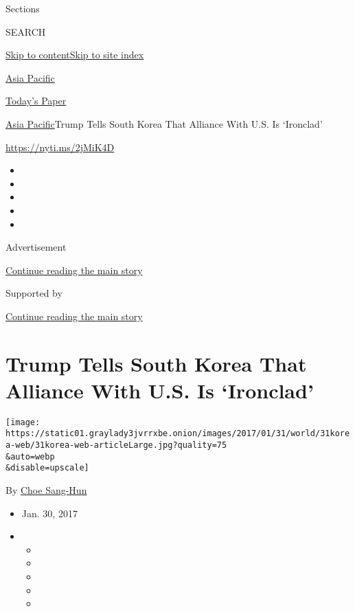 Sections

SEARCH

\protect\hyperlink{site-content}{Skip to
content}\protect\hyperlink{site-index}{Skip to site index}

\href{https://www.nytimes3xbfgragh.onion/section/world/asia}{Asia
Pacific}

\href{https://myaccount.nytimes3xbfgragh.onion/auth/login?response_type=cookie\&client_id=vi}{}

\href{https://www.nytimes3xbfgragh.onion/section/todayspaper}{Today's
Paper}

\href{/section/world/asia}{Asia Pacific}\textbar{}Trump Tells South
Korea That Alliance With U.S. Is `Ironclad'

\url{https://nyti.ms/2jMiK4D}

\begin{itemize}
\item
\item
\item
\item
\item
\end{itemize}

Advertisement

\protect\hyperlink{after-top}{Continue reading the main story}

Supported by

\protect\hyperlink{after-sponsor}{Continue reading the main story}

\hypertarget{trump-tells-south-korea-that-alliance-with-us-is-ironclad}{%
\section{Trump Tells South Korea That Alliance With U.S. Is
`Ironclad'}\label{trump-tells-south-korea-that-alliance-with-us-is-ironclad}}

\texttt{[image: https://static01.graylady3jvrrxbe.onion/images/2017/01/31/world/31korea-web/31korea-web-articleLarge.jpg?quality=75\\\&auto=webp\\\&disable=upscale]}

By \href{http://www.nytimes3xbfgragh.onion/by/choe-sang-hun}{Choe
Sang-Hun}

\begin{itemize}
\item
  Jan. 30, 2017
\item
  \begin{itemize}
  \item
  \item
  \item
  \item
  \item
  \end{itemize}
\end{itemize}

